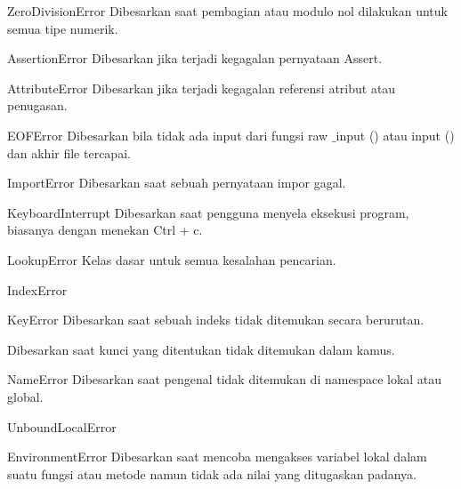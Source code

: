 \vspace{12pt}
ZeroDivisionError \hspace*{0.5in} Dibesarkan saat pembagian atau modulo nol dilakukan untuk semua tipe numerik. \par
\vspace{12pt}
AssertionError \hspace*{0.5in} Dibesarkan jika terjadi kegagalan pernyataan Assert. \par
\vspace{12pt}
AttributeError \hspace*{0.5in} Dibesarkan jika terjadi kegagalan referensi atribut atau penugasan. \par
\vspace{12pt}
EOFError \hspace*{0.5in} Dibesarkan bila tidak ada input dari fungsi raw $  \_  $input () atau input () dan akhir file tercapai. \par
\vspace{12pt}
ImportError \hspace*{0.5in} Dibesarkan saat sebuah pernyataan impor gagal. \par
\vspace{12pt}
KeyboardInterrupt \hspace*{0.5in} Dibesarkan saat pengguna menyela eksekusi program, biasanya dengan menekan Ctrl + c. \par
\vspace{12pt}
LookupError \hspace*{0.5in} Kelas dasar untuk semua kesalahan pencarian. \par
\vspace{12pt}
IndexError \par
KeyError \hspace*{0.5in} Dibesarkan saat sebuah indeks tidak ditemukan secara berurutan. \par
Dibesarkan saat kunci yang ditentukan tidak ditemukan dalam kamus. \par
\vspace{12pt}
NameError \hspace*{0.5in} Dibesarkan saat pengenal tidak ditemukan di namespace lokal atau global. \par
\vspace{12pt}
UnboundLocalError \par
EnvironmentError \hspace*{0.5in} Dibesarkan saat mencoba mengakses variabel lokal dalam suatu fungsi atau metode namun tidak ada nilai yang ditugaskan padanya. \par
